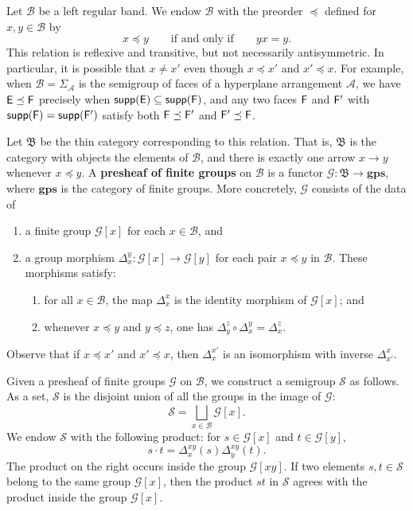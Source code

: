 \documentclass[11pt, oneside, reqno]{amsart}
\theoremstyle{definition}
\numberwithin{equation}{section}
\newcommand{\defn}[1]{{\color{RoyalBlue}\bf#1}}
\def \A{{\mathcal{A}}}
\def \BB{{\mathcal{B}}}
\def \GG{{\mathcal{G}}}
\def \SS{{\mathcal{S}}}
\def\qqiff{\qquad\text{if and only if}\qquad}
\def \supp{\mathsf{supp}}
\begin{document}
Let $\BB$ be a left regular band. We endow $\BB$ with the preorder $\preceq$
defined for $x, y \in \BB$ by
\begin{equation*}
    x \preceq y
    \qqiff
    y x = y.
\end{equation*}
This relation is reflexive and transitive, but not necessarily antisymmetric.
In particular, it is possible that $x \neq x'$ even though $x \preceq x'$ and $x' \preceq x$.
For example, when $\BB = \Sigma_{\A}$ is the semigroup of faces of a hyperplane
arrangement $\A$, we have ${\sf E} \preceq {\sf F}$ precisely when $\supp({\sf
E}) \subseteq \supp({\sf F})$, and any two faces ${\sf F}$ and ${\sf F'}$
with $\supp({\sf F}) = \supp({\sf F'})$ satisfy both
${\sf F} \preceq {\sf F'}$ and ${\sf F'} \preceq {\sf F}$.

Let $\mathfrak{B}$ be the thin category corresponding to this relation.
That is, $\mathfrak{B}$ is the category with objects the elements of $\BB$, and
there is exactly one arrow $x \to y$ whenever $x \preceq y$.
A \defn{presheaf of finite groups} on $\BB$ is a functor $\GG : \mathfrak{B} \to
\mathbf{gps}$, where $\mathbf{gps}$ is the category of finite groups.
More concretely, $\GG$ consists of the data of
\begin{enumerate}
    \item a finite group $\GG[x]$ for each $x \in \BB$, and
    \item a group morphism $\Delta_x^y : \GG[x] \to \GG[y]$ for each pair $x \preceq y$ in $\BB$.
    These morphisms satisfy:
    \begin{enumerate}[label=(\roman*)]
        \item
            for all $x \in \BB$, the map $\Delta_x^x$ is the identity morphism of $\GG[x]$; and
        \item
            whenever $x \preceq y$ and $y \preceq z$, one has $\Delta_y^z \circ \Delta_x^y = \Delta_x^z$.
    \end{enumerate}
\end{enumerate}
Observe that if $x \preceq x'$ and $x' \preceq x$,
then $\Delta_x^{x'}$ is an isomorphism with inverse $\Delta_{x'}^x$.

Given a presheaf of finite groups $\GG$ on $\BB$, we construct a semigroup
$\SS$ as follows.
As a set, $\SS$ is the disjoint union of all the groups in the image of $\GG$:
\begin{equation}
    \label{presheaf-construction}
    \SS = \bigsqcup_{x \in \BB} \GG[x].
\end{equation}
We endow $\SS$ with the following product: for $s \in \GG[x]$ and $t \in \GG[y]$,
\begin{equation}\label{eq:sh-to-lrgb}
    s \cdot t = \Delta_x^{xy}(s)\Delta_y^{xy}(t).
\end{equation}
The product on the right occurs inside the group $\GG[xy]$.
If two elements $s,t \in \SS$ belong to the same group $\GG[x]$, then the product $st$ in $\SS$ agrees with the product inside the group $\GG[x]$.
\end{document}
